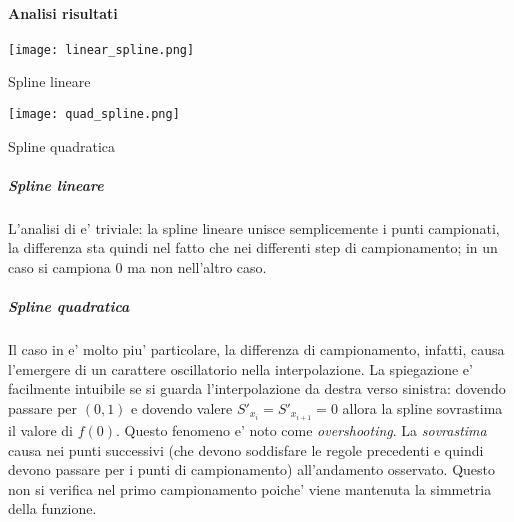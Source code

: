 \paragraph{Analisi risultati}

\begin{marginfigure}
    \hspace{-2.1cm}
	\texttt{[image: linear\_spline.png]}
	\caption{Spline lineare}
	\label{fig:linear_spline}
\end{marginfigure}

\begin{marginfigure}
    \hspace{-2.1cm}
	\texttt{[image: quad\_spline.png]}
	\caption{Spline quadratica}
	\label{fig:quad_spline}
\end{marginfigure}

\subparagraph{Spline lineare}
L'analisi di  e' triviale: la spline lineare unisce semplicemente i punti campionati, la differenza sta quindi nel fatto che nei differenti
step di campionamento; in un caso si campiona 0 ma non nell'altro caso.

\subparagraph{Spline quadratica}

Il caso in  e' molto piu' particolare, la differenza di campionamento, infatti, causa l'emergere di un carattere oscillatorio nella interpolazione. La spiegazione e' facilmente intuibile se si guarda l'interpolazione da destra verso sinistra: dovendo passare per $(0,1)$ e dovendo valere $S'_{x_i}=S'_{x_{i+1}}=0$ allora la spline sovrastima il valore di $f(0)$. Questo fenomeno e' noto come \textit{overshooting}.
La \textit{sovrastima} causa nei punti successivi (che devono soddisfare le regole precedenti e quindi devono passare per i punti di campionamento) all'andamento osservato. Questo non si verifica nel primo campionamento poiche' viene mantenuta la simmetria della funzione.


